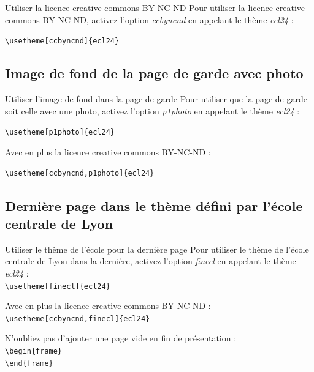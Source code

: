 \documentclass[9pt]{beamer}
\begin{document}
\begin{frame}[fragile]{\insertsection}{\insertsubsection}
  \begin{block}{Utiliser la licence creative commons BY-NC-ND}
    Pour utiliser la licence creative commons BY-NC-ND, activez l'option \emph{ccbyncnd} en appelant le thème \emph{ecl24} :

    \verb+\usetheme[ccbyncnd]{ecl24}+
  \end{block}
\end{frame}

\subsection{Image de fond de la page de garde avec photo}

\begin{frame}[fragile]{\insertsection}{\insertsubsection}
  \begin{block}{Utiliser l'image de fond dans la page de garde}
    Pour utiliser que la page de garde soit celle avec une photo, activez l'option \emph{p1photo} en appelant le thème \emph{ecl24} :

    \verb+\usetheme[p1photo]{ecl24}+

    Avec en plus la licence creative commons BY-NC-ND :

    \verb+\usetheme[ccbyncnd,p1photo]{ecl24}+
\end{block}
\end{frame}

\subsection{Dernière page dans le thème défini par l'école centrale de Lyon}

\begin{frame}[fragile]{\insertsection}{\insertsubsection}
  \begin{block}{Utiliser le thème de l'école pour la dernière page}
    Pour utiliser le thème de l'école centrale de Lyon dans la dernière, activez l'option \emph{finecl} en appelant le thème \emph{ecl24} :\\
    \verb+\usetheme[finecl]{ecl24}+

    Avec en plus la licence creative commons BY-NC-ND :\\
    \verb+\usetheme[ccbyncnd,finecl]{ecl24}+

    N'oubliez pas d'ajouter une page vide en fin de présentation :\\
    \verb+\begin{frame}+\\
    \verb+\end{frame}+
  \end{block}
\end{frame}

\begin{frame}
\end{frame}
\end{document}
